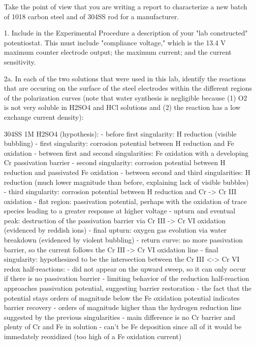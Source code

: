 Take the point of view that you are writing a report to characterize a new batch of 1018 carbon steel and of 304SS rod for a manufacturer.

1. Include in the Experimental Procedure a description of your "lab constructed" potentiostat.  This must include "compliance voltage," which is the 13.4 V maximum counter electrode output; the maximum current; and the current sensitivity.

2a. In each of the two solutions that were used in this lab, identify the reactions that are occuring on the surface of the steel electrodes within the different regions of the polarization curves (note that water synthesis is negligible because (1) O2 is not very soluble in H2SO4 and HCl solutions and (2) the reaction has a low exchange current density):

	304SS 1M H2SO4 (hypothesis):
	- before first singularity: H reduction (visible bubbling)
	- first singularity: corrosion potential between H reduction and Fe oxidation
	- between first and second singularities: Fe oxidation with a developing Cr passivation barrier
	- second singularity: corrosion potential between H reduction and passivated Fe oxidation
	- between second and third singularities: H reduction (much lower magnitude than before, explaining lack of visible bubbles)
	- third singularity: corrosion potential between H reduction and Cr -> Cr III oxidation
	- flat region: passivation potential, perhaps with the oxidation of trace species leading to a greater response at higher voltage
	- upturn and eventual peak: destruction of the passivation barrier via Cr III -> Cr VI oxidation (evidenced by reddish ions)
	- final upturn: oxygen gas evolution via water breakdown (evidenced by violent bubbling)
	- return curve: no more passivation barrier, so the current follows the Cr III -> Cr VI oxidation line
	- final singularity: hypothesized to be the intersection between the Cr III <-> Cr VI redox half-reactions:
		- did not appear on the upward sweep, so it can only occur if there is no passivation barrier
		- limiting behavior of the reduction half-reaction approaches passivation potential, suggesting barrier restoration
		- the fact that the potential stays orders of magnitude below the Fe oxidation potential indicates barrier recovery
		- orders of magnitude higher than the hydrogen reduction line suggested by the previous singularities
		- main difference is no Cr barrier and plenty of Cr and Fe in solution
		- can't be Fe deposition since all of it would be immedately reoxidized (too high of a Fe oxidation current)

